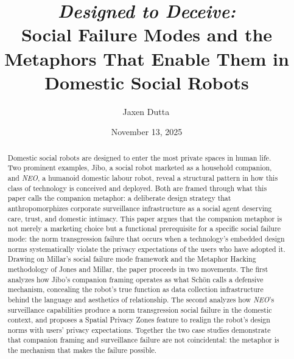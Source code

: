 \documentclass[11pt,showkeys]{../../shared/essay}
\newcommand{\neo}{\textit{NEO}}
\begin{document}
\title{\textit{Designed to Deceive:}\\
Social Failure Modes and the Metaphors That Enable Them in Domestic Social Robots}

\author{Jaxen Dutta\,}

\date{November 13, 2025}

\begin{abstract}
Domestic social robots are designed to enter the most private spaces in human life. Two prominent examples, Jibo, a social robot marketed as a household companion, and \neo{}, a humanoid domestic labour robot, reveal a structural pattern in how this class of technology is conceived and deployed. Both are framed through what this paper calls the companion metaphor: a deliberate design strategy that anthropomorphizes corporate surveillance infrastructure as a social agent deserving care, trust, and domestic intimacy. This paper argues that the companion metaphor is not merely a marketing choice but a functional prerequisite for a specific social failure mode: the norm transgression failure that occurs when a technology's embedded design norms systematically violate the privacy expectations of the users who have adopted it. Drawing on Millar's social failure mode framework and the Metaphor Hacking methodology of Jones and Millar, the paper proceeds in two movements. The first analyzes how Jibo's companion framing operates as what Sch\"{o}n calls a defensive mechanism, concealing the robot's true function as data collection infrastructure behind the language and aesthetics of relationship. The second analyzes how \neo{}'s surveillance capabilities produce a norm transgression social failure in the domestic context, and proposes a Spatial Privacy Zones feature to realign the robot's design norms with users' privacy expectations. Together the two case studies demonstrate that companion framing and surveillance failure are not coincidental: the metaphor is the mechanism that makes the failure possible.
\end{abstract}

\end{document}
